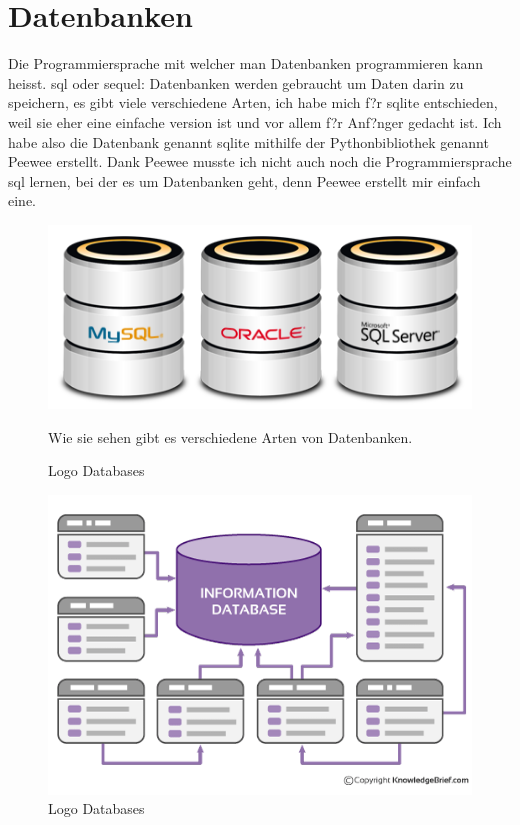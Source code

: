 \documentclass{article}
\begin{document}
\cleardoublepage

\section{Datenbanken}
Die Programmiersprache mit welcher man Datenbanken programmieren kann heisst. sql oder sequel:
Datenbanken werden gebraucht um Daten darin zu speichern, es gibt viele verschiedene Arten, ich habe mich f?r sqlite entschieden, weil sie eher eine einfache version ist und vor allem f?r Anf?nger gedacht ist.
Ich habe also die Datenbank genannt sqlite mithilfe der Pythonbibliothek genannt Peewee erstellt.
Dank Peewee musste ich nicht auch noch die Programmiersprache sql lernen, bei der es um Datenbanken geht, denn Peewee erstellt mir einfach eine.



\begin{figure}[ht]
    \centering
    \includegraphics[width=.5\linewidth]{database}
    \caption{Logo Databases}
    \label{fig:sub1}{Wie sie sehen gibt es verschiedene Arten von Datenbanken.}
    \end{figure}

    \begin{figure}[ht]
        \centering
        \includegraphics[width=.8\linewidth]{database1}
        \caption{Logo Databases}
        \label{fig:sub1}{}
        \end{figure}
%
%
%
%
%
\end{document}

